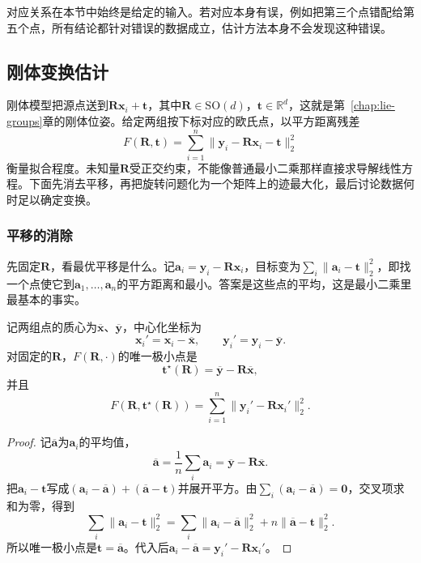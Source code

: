 对应关系在本节中始终是给定的输入。若对应本身有误，例如把第三个点错配给第五个点，所有结论都针对错误的数据成立，估计方法本身不会发现这种错误。

\subsection{刚体变换估计}
\label{sec:smap-rigid}

刚体模型把源点送到$\bm R\bm x_i+\bm t$，其中$\bm R\in\mathrm{SO}(d)$，$\bm t\in\mathbb R^d$，这就是第~\ref{chap:lie-groups}章的刚体位姿。给定两组按下标对应的欧氏点，以平方距离残差
\begin{equation}
 F(\bm R,\bm t)=\sum_{i=1}^n\lVert\bm y_i-\bm R\bm x_i-\bm t\rVert_2^2
 \label{eq:smap-rigid-objective}
\end{equation}
衡量拟合程度。未知量$\bm R$受正交约束，不能像普通最小二乘那样直接求导解线性方程。下面先消去平移，再把旋转问题化为一个矩阵上的迹最大化，最后讨论数据何时足以确定变换。

\subsubsection{平移的消除}
\label{sec:smap-translation}

先固定$\bm R$，看最优平移是什么。记$\bm a_i=\bm y_i-\bm R\bm x_i$，目标变为$\sum_i\lVert\bm a_i-\bm t\rVert_2^2$，即找一个点使它到$\bm a_1,\ldots,\bm a_n$的平方距离和最小。答案是这些点的平均，这是最小二乘里最基本的事实。

\begin{lemma}[最优平移]
\label{lem:smap-optimal-translation}
记两组点的质心为$\overline{\bm x}$、$\overline{\bm y}$，中心化坐标为
\begin{equation}
 \bm x_i'=\bm x_i-\overline{\bm x},\qquad\bm y_i'=\bm y_i-\overline{\bm y}.
 \label{eq:smap-centered-points}
\end{equation}
对固定的$\bm R$，$F(\bm R,\cdot)$的唯一极小点是
\begin{equation}
 \bm t^\star(\bm R)=\overline{\bm y}-\bm R\overline{\bm x},
 \label{eq:smap-optimal-translation}
\end{equation}
并且
\begin{equation}
 F(\bm R,\bm t^\star(\bm R))=\sum_{i=1}^n\lVert\bm y_i'-\bm R\bm x_i'\rVert_2^2 .
 \label{eq:smap-centered-objective}
\end{equation}
\end{lemma}
\begin{proof}
记$\overline{\bm a}$为$\bm a_i$的平均值，
\[
 \overline{\bm a}=\frac1n\sum_i\bm a_i=\overline{\bm y}-\bm R\overline{\bm x}.
\]
把$\bm a_i-\bm t$写成$(\bm a_i-\overline{\bm a})+(\overline{\bm a}-\bm t)$并展开平方。由$\sum_i(\bm a_i-\overline{\bm a})=\bm0$，交叉项求和为零，得到
\[
 \sum_i\lVert\bm a_i-\bm t\rVert_2^2=\sum_i\lVert\bm a_i-\overline{\bm a}\rVert_2^2+n\lVert\overline{\bm a}-\bm t\rVert_2^2 .
\]
所以唯一极小点是$\bm t=\overline{\bm a}$。代入后$\bm a_i-\overline{\bm a}=\bm y_i'-\bm R\bm x_i'$。
\end{proof}

